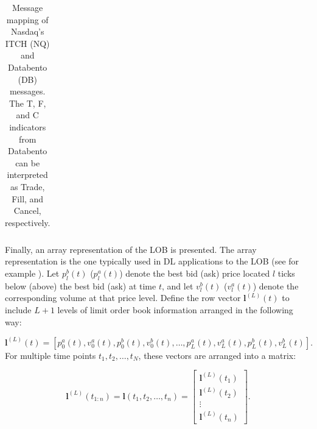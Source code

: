\documentclass[10pt,a4paper,oneside]{article}
\providecommand{\DIFaddbegin}{} %
\providecommand{\DIFaddend}{} %
\providecommand{\DIFdelbegin}{} %
\providecommand{\DIFdelend}{} %
\newcommand{\DIFscaledelfig}{0.5}
\newlength{\DIFdelgraphicswidth} %
\newlength{\DIFdelgraphicsheight} %
\newcommand{\DIFaddincludegraphics}[2][]{{\color{blue}\fbox{\DIFOincludegraphics[#1]{#2}}}} %
\newcommand{\DIFdelincludegraphics}[2][]{%
\sbox{\DIFdelgraphicsbox}{\DIFOincludegraphics[#1]{#2}}%
\settoboxwidth{\DIFdelgraphicswidth}{\DIFdelgraphicsbox} %
\settoboxtotalheight{\DIFdelgraphicsheight}{\DIFdelgraphicsbox} %
\scalebox{\DIFscaledelfig}{%
\parbox[b]{\DIFdelgraphicswidth}{\usebox{\DIFdelgraphicsbox}\\[-\baselineskip] \rule{\DIFdelgraphicswidth}{0em}}\llap{\resizebox{\DIFdelgraphicswidth}{\DIFdelgraphicsheight}{%
\setlength{\unitlength}{\DIFdelgraphicswidth}%
\begin{picture}(1,1)%
\thicklines\linethickness{2pt} %
{\color[rgb]{1,0,0}\put(0,0){\framebox(1,1){}}}%
{\color[rgb]{1,0,0}\put(0,0){\line( 1,1){1}}}%
{\color[rgb]{1,0,0}\put(0,1){\line(1,-1){1}}}%
\end{picture}%
}\hspace*{3pt}}} %
} %
\DeclareRobustCommand{\DIFaddbegin}{\DIFOaddbegin \let\includegraphics\DIFaddincludegraphics} %
\DeclareRobustCommand{\DIFaddend}{\DIFOaddend \let\includegraphics\DIFOincludegraphics} %
\DeclareRobustCommand{\DIFdelbegin}{\DIFOdelbegin \let\includegraphics\DIFdelincludegraphics} %
\DeclareRobustCommand{\DIFdelend}{\DIFOaddend \let\includegraphics\DIFOincludegraphics} %
\begin{document}
\begin{table}[h!]
\begin{tabular}{|l|l|l|l|}
    \end{tabular}
    \caption{Message mapping of Nasdaq's ITCH (NQ) and Databento (DB) messages. The T, F, and C indicators from Databento can be interpreted as Trade, Fill, and Cancel, respectively.}
    \label{tab:db_itch_mapping}
\end{table}


Finally, an array representation of the LOB is presented. The array representation is the one typically used in DL applications to the LOB (see for example \cite{kolm2024improving, Zhang_2019}). Let $p_l^b(t)$ ($p_l^a(t)$) denote the best bid (ask) price located $l$ ticks below (above) the best bid (ask) at time $t$, and let $v_l^b(t)$ ($v_l^a(t)$) denote the corresponding volume at that price level. Define the row vector $\mathbf{l}^{(L)}(t)$ to include $L + 1$ levels of limit order book information arranged in the following way:

$$
    \mathbf{l}^{(L)}(t) = [p^a_0(t), v^a_0(t), p^b_0(t), v^b_0(t), \dots, p^a_L(t), v^a_L(t), p^b_L(t), v^b_L(t)].
$$
For multiple time points $t_1, t_2, \dots, t_N$, these vectors are arranged into a matrix:

$$
    \mathbf{l}^{(L)}(t_{1:n})=\mathbf{l}(t_1, t_2, \dots, t_n) = \DIFdelbegin %
\DIFdelend \DIFaddbegin \begin{bmatrix}
        \mathbf{l}^{(L)}(t_1) \\
        \mathbf{l}^{(L)}(t_2) \\
        \vdots                \\
        \mathbf{l}^{(L)}(t_n)
    \end{bmatrix}\DIFaddend .
$$

\end{document}

